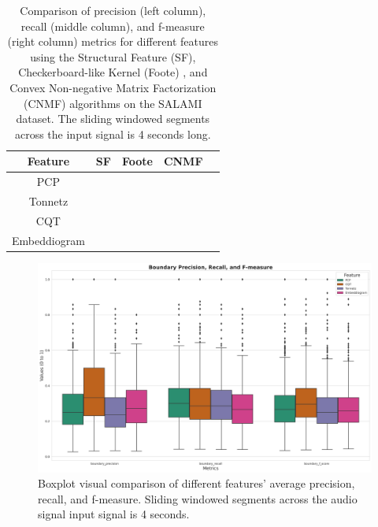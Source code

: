 
\begin{table}
  \centering
  \begin{adjustbox}{width=\textwidth}
  \begin{threeparttable}
    \begin{tabular}{c|c|c|c|c} 
\toprule
     \textbf{Feature} & \textbf{SF} & \textbf{Foote} & \textbf{CNMF} 
     \\ \midrule 
     PCP & \usebox{\pcpSF} & \usebox{\pcpFoote} & \usebox{\pcpCNMF} \\\hline
     Tonnetz & \usebox{\tonnetzSF} & \usebox{\tonnetzFoote} & \usebox{\tonnetzCNMF} \\\hline
     CQT & \usebox{\cqtSF} & \usebox{\cqtFoote} & \usebox{\cqtCNMF} \\\hline
     Embeddiogram & \usebox{\embeddiobSF} & \usebox{\embeddiobFoote} & \usebox{\embeddiobCNMF} \\
     \bottomrule
    \end{tabular}
    \caption[Metric comparison: audio features and segmentation algorithms]{Comparison of precision (left column), recall (middle column), and f-measure (right column) metrics for different features using the Structural Feature (SF)\cite{sf}, Checkerboard-like Kernel (Foote) \cite{Foote2000AutomaticNovelty}, and Convex Non-negative Matrix Factorization (CNMF) \cite{NietoCONVEXIDENTIFICATION} algorithms on the SALAMI dataset. The sliding windowed segments across the input signal is 4 seconds long.}\label{ta:results}
  \end{threeparttable}
  \end{adjustbox}
\end{table}


\begin{figure}
    \centering
    \includegraphics[width=\textwidth]{figures/images/boxplot.png}
    \caption[Metric comparison for different audio features.]{\small{Boxplot visual comparison of different features' average precision, recall, and f-measure. Sliding windowed segments across the audio signal input signal is 4 seconds.}}
    \label{fig:boxplotmetrics}
\end{figure}

